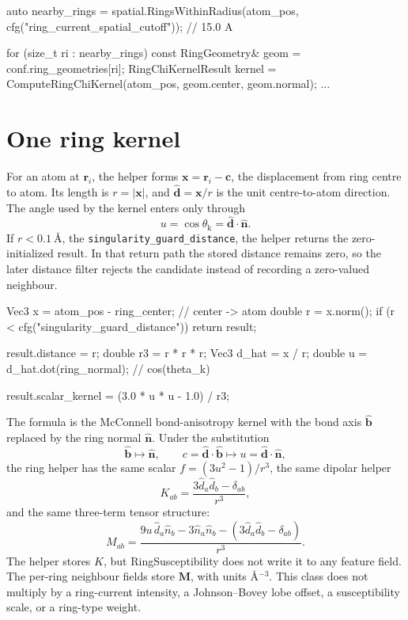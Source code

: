 \documentclass[11pt]{article}
\newcommand{\code}[1]{\texttt{#1}}
\begin{document}
\begin{codebox}
auto nearby_rings =
    spatial.RingsWithinRadius(atom_pos,
        cfg("ring_current_spatial_cutoff"));       // 15.0 A

for (size_t ri : nearby_rings) {
    const RingGeometry& geom = conf.ring_geometries[ri];
    RingChiKernelResult kernel =
        ComputeRingChiKernel(atom_pos, geom.center, geom.normal);
    ...
}
\end{codebox}

\section{One ring kernel}

For an atom at \(\bm r_i\), the helper forms
\(\bm x=\bm r_i-\bm c\), the displacement from ring centre to atom. Its length
is \(r=|\bm x|\), and \(\hat{\bm d}=\bm x/r\) is the unit centre-to-atom
direction. The angle used by the kernel enters only through
\[
  u=\cos\theta_{\mathrm{k}}=\hat{\bm d}\cdot\hat{\bm n}.
\]
If \(r<\SI{0.1}{\angstrom}\), the \code{singularity\_guard\_distance}, the
helper returns the zero-initialized result. In that return path the stored
distance remains zero, so the later distance filter rejects the candidate
instead of recording a zero-valued neighbour.

\begin{codebox}
Vec3 x = atom_pos - ring_center;          // center -> atom
double r = x.norm();
if (r < cfg("singularity_guard_distance")) return result;

result.distance = r;
double r3 = r * r * r;
Vec3 d_hat = x / r;
double u = d_hat.dot(ring_normal);        // cos(theta_k)

result.scalar_kernel = (3.0 * u * u - 1.0) / r3;
\end{codebox}

The formula is the McConnell bond-anisotropy kernel with the bond axis
\(\hat{\bm b}\) replaced by the ring normal \(\hat{\bm n}\). Under the
substitution
\[
  \hat{\bm b}\mapsto\hat{\bm n},\qquad
  c=\hat{\bm d}\cdot\hat{\bm b}\mapsto
  u=\hat{\bm d}\cdot\hat{\bm n},
\]
the ring helper has the same scalar \(f=(3u^2-1)/r^3\), the same dipolar helper
\[
  K_{ab}=\frac{3\hat d_a\hat d_b-\delta_{ab}}{r^3},
\]
and the same three-term tensor structure:
\[
  M_{ab} =
  \frac{
     9u\,\hat d_a\hat n_b
    -3\hat n_a\hat n_b
    -\left(3\hat d_a\hat d_b-\delta_{ab}\right)}
  {r^3}.
\]
The helper stores \(K\), but RingSusceptibility does not write it to any feature
field. The per-ring neighbour fields store \(\bm M\), with units
\(\si{\angstrom^{-3}}\). This class does not multiply by a ring-current
intensity, a Johnson--Bovey lobe offset, a susceptibility scale, or a
ring-type weight.
\end{document}
